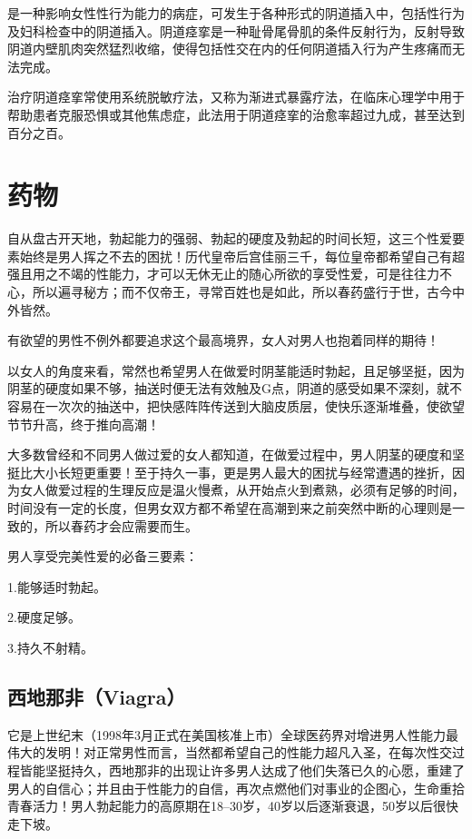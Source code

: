 \documentclass[12pt,UTF8]{ctexbook}
\begin{document}
是一种影响女性性行为能力的病症，可发生于各种形式的阴道插入中，包括性行为及妇科检查中的阴道插入。阴道痉挛是一种耻骨尾骨肌的条件反射行为，反射导致阴道内壁肌肉突然猛烈收缩，使得包括性交在内的任何阴道插入行为产生疼痛而无法完成。

治疗阴道痉挛常使用系统脱敏疗法，又称为渐进式暴露疗法，在临床心理学中用于帮助患者克服恐惧或其他焦虑症，此法用于阴道痉挛的治愈率超过九成，甚至达到百分之百。

\chapter{药物}

自从盘古开天地，勃起能力的强弱、勃起的硬度及勃起的时间长短，这三个性爱要素始终是男人挥之不去的困扰！历代皇帝后宫佳丽三千，每位皇帝都希望自己有超强且用之不竭的性能力，才可以无休无止的随心所欲的享受性爱，可是往往力不心，所以遍寻秘方；而不仅帝王，寻常百姓也是如此，所以春药盛行于世，古今中外皆然。

有欲望的男性不例外都要追求这个最高境界，女人对男人也抱着同样的期待！

以女人的角度来看，常然也希望男人在做爱时阴茎能适时勃起，且足够坚挺，因为阴茎的硬度如果不够，抽送时便无法有效触及G点，阴道的感受如果不深刻，就不容易在一次次的抽送中，把快感阵阵传送到大脑皮质层，使快乐逐渐堆叠，使欲望节节升高，终于推向高潮！

大多数曾经和不同男人做过爱的女人都知道，在做爱过程中，男人阴茎的硬度和坚挺比大小长短更重要！至于持久一事，更是男人最大的困扰与经常遭遇的挫折，因为女人做爱过程的生理反应是温火慢煮，从开始点火到煮熟，必须有足够的时间，时间没有一定的长度，但男女双方都不希望在高潮到来之前突然中断的心理则是一致的，所以春药才会应需要而生。

男人享受完美性爱的必备三要素：

1.能够适时勃起。

2.硬度足够。

3.持久不射精。

\section{西地那非（Viagra）}

它是上世纪末（1998年3月正式在美国核准上市）全球医药界对增进男人性能力最伟大的发明！对正常男性而言，当然都希望自己的性能力超凡入圣，在每次性交过程皆能坚挺持久，西地那非的出现让许多男人达成了他们失落已久的心愿，重建了男人的自信心；并且由于性能力的自信，再次点燃他们对事业的企图心，生命重拾青春活力！男人勃起能力的高原期在18--30岁，40岁以后逐渐衰退，50岁以后很快走下坡。
\end{document}
